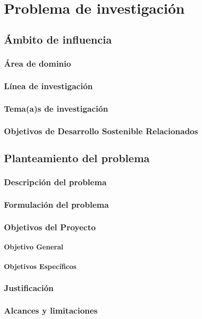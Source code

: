 \chapter{Problema de investigación}

\section{Ámbito de influencia}
	
		\subsection{Área de dominio}
		\subsection{Línea de investigación}
		\subsection{Tema(a)s de investigación}
		\subsection{Objetivos de Desarrollo Sostenible Relacionados}
\section{Planteamiento del problema}	
	\subsection{Descripción del problema}
	\subsection{Formulación del problema}
	\subsection{Objetivos del Proyecto}
		\subsubsection{Objetivo General}
		\subsubsection{Objetivos Específicos}
	\subsection{Justificación}
	\subsection{Alcances y limitaciones}
		
	
	